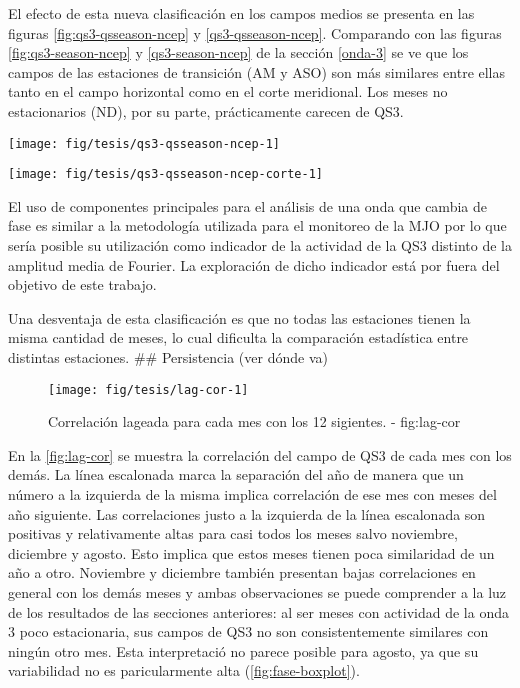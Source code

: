 \documentclass[spanish,a4paper]{book}
\begin{document}
El efecto de esta nueva clasificación en los campos medios se presenta
en las figuras \ref{fig:qs3-qsseason-ncep} y \ref{qs3-qsseason-ncep}.
Comparando con las figuras \ref{fig:qs3-season-ncep} y
\ref{qs3-season-ncep} de la sección \ref{onda-3} se ve que los campos de
las estaciones de transición (AM y ASO) son más similares entre ellas
tanto en el campo horizontal como en el corte meridional. Los meses no
estacionarios (ND), por su parte, prácticamente carecen de QS3.

\begin{figure*}
\texttt{[image: fig/tesis/qs3-qsseason-ncep-1]} \caption{Media de reconstrucción de onda 3 en 300hPa - fig:qs3-qsseason-ncep}\label{fig:qs3-qsseason-ncep}
\end{figure*}

\begin{figure*}
\texttt{[image: fig/tesis/qs3-qsseason-ncep-corte-1]} \caption{Corte - fig:qs3-qsseason-ncep-corte}\label{fig:qs3-qsseason-ncep-corte}
\end{figure*}

El uso de componentes principales para el análisis de una onda que
cambia de fase es similar a la metodología utilizada para el monitoreo
de la MJO por lo que sería posible su utilización como
indicador de la actividad de la QS3 distinto de la amplitud media de
Fourier. La exploración de dicho indicador está por fuera del objetivo
de este trabajo.

Una desventaja de esta clasificación es que no todas las estaciones
tienen la misma cantidad de meses, lo cual dificulta la comparación
estadística entre distintas estaciones. \#\# Persistencia (ver dónde va)

\begin{figure}
\texttt{[image: fig/tesis/lag-cor-1]} \caption{Correlación lageada para cada mes con los 12 sigientes. - fig:lag-cor}\label{fig:lag-cor}
\end{figure}

En la \autoref{fig:lag-cor} se muestra la correlación del campo de QS3
de cada mes con los demás. La línea escalonada marca la separación del
año de manera que un número a la izquierda de la misma implica
correlación de ese mes con meses del año siguiente. Las correlaciones
justo a la izquierda de la línea escalonada son positivas y
relativamente altas para casi todos los meses salvo noviembre, diciembre
y agosto. Esto implica que estos meses tienen poca similaridad de un año
a otro. Noviembre y diciembre también presentan bajas correlaciones en
general con los demás meses y ambas observaciones se puede comprender a
la luz de los resultados de las secciones anteriores: al ser meses con
actividad de la onda 3 poco estacionaria, sus campos de QS3 no son
consistentemente similares con ningún otro mes. Esta interpretació no
parece posible para agosto, ya que su variabilidad no es paricularmente
alta (\autoref{fig:fase-boxplot}).
\end{document}
